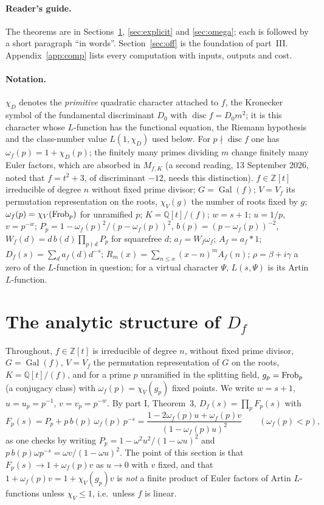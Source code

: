 \documentclass[11pt,a4paper]{article}
\theoremstyle{remark}\newtheorem{remark}[theorem]{Remark}
\newcommand{\Z}{\mathbb{Z}}\newcommand{\Q}{\mathbb{Q}}\newcommand{\F}{\mathbb{F}}\newcommand{\C}{\mathbb{C}}
\begin{document}
\paragraph{Reader's guide.} The theorems are in Sections~\ref{sec:structure}, \ref{sec:explicit} and
\ref{sec:omega}; each is followed by a short paragraph ``in words''. Section~\ref{sec:off} is the foundation
of part~III. Appendix~\ref{app:comp} lists every computation with inputs, outputs and cost.

\paragraph{Notation.} $\chi_D$ denotes the \emph{primitive} quadratic character attached to $f$, the Kronecker symbol
of the fundamental discriminant $D_0$ with $\operatorname{disc}f=D_0m^2$; it is this character whose $L$-function has the
functional equation, the Riemann hypothesis and the class-number value $L(1,\chi_D)$ used below. For $p\nmid\operatorname{disc}f$
one has $\omega_f(p)=1+\chi_D(p)$; the finitely many primes dividing $m$ change finitely many Euler factors, which are
absorbed in $M_{f,K}$ (a second reading, 13 September 2026, noted that $f=t^2+3$, of discriminant $-12$, needs this
distinction). $f\in\Z[t]$ irreducible of degree $n$ without fixed prime divisor; $G=\operatorname{Gal}(f)$;
$V=V_f$ its permutation representation on the roots, $\chi_V(g)$ the number of roots fixed by $g$;
$\omega_f(p)=\chi_V(\operatorname{Frob}_p)$ for unramified $p$; $K=\Q[t]/(f)$; $w=s+1$; $u=1/p$, $v=p^{-w}$;
$P_p=1-\omega_f(p)^2/(p-\omega_f(p))^2$, $b(p)=(p-\omega_f(p))^{-2}$, $W_f(d)=d\,b(d)\prod_{p\nmid d}P_p$ for squarefree $d$;
$a_f=W_f\omega_f$; $A_f=a_f*1$; $D_f(s)=\sum_da_f(d)d^{-s}$; $R_m(x)=\sum_{n\le x}(x-n)^mA_f(n)$;
$\rho=\beta+i\gamma$ a zero of the $L$-function in question; for a virtual character $\Psi$, $L(s,\Psi)$ is its
Artin $L$-function.

\section{The analytic structure of $D_f$}\label{sec:structure}

Throughout, $f\in\Z[t]$ is irreducible of degree $n$, without fixed prime divisor, $G=\operatorname{Gal}(f)$,
$V=V_f$ the permutation representation of $G$ on the roots, $K=\Q[t]/(f)$, and for a prime $p$ unramified
in the splitting field, $g_p=\operatorname{Frob}_p$ (a conjugacy class) with $\omega_f(p)=\chi_V(g_p)$ fixed points. We
write $w=s+1$, $u=u_p=p^{-1}$, $v=v_p=p^{-w}$. By part I, Theorem~3, $D_f(s)=\prod_pF_p(s)$ with
\begin{equation}\label{eq:Fp}
F_p(s)=P_p+p\,b(p)\,\omega_f(p)\,p^{-s}=\frac{1-2\omega_f(p)u+\omega_f(p)v}{(1-\omega_f(p)u)^2}\qquad(\omega_f(p)<p),
\end{equation}
as one checks by writing $P_p=1-\omega^2u^2/(1-\omega u)^2$ and $p\,b(p)\omega p^{-s}=\omega v/(1-\omega u)^2$.
The point of this section is that $F_p(s)\to1+\omega_f(p)v$ as $u\to0$ with $v$ fixed, and that
$1+\omega_f(p)v=1+\chi_V(g_p)v$ is \emph{not} a finite product of Euler factors of Artin $L$-functions
unless $\chi_V\le1$, i.e.\ unless $f$ is linear.
\end{document}
